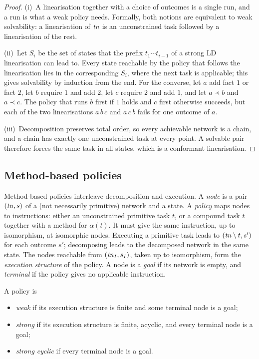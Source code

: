 \begin{proof}
  (i)~A linearisation together with a choice of outcomes is a single run, and a run is what a
  weak policy needs. Formally, both notions are equivalent to weak solvability: a linearisation
  of $\mathit{tn}$ is an unconstrained task followed by a linearisation of the rest.

  (ii)~Let $S_i$ be the set of states that the prefix $t_1\cdots t_{i-1}$ of a strong LD
  linearisation can lead to. Every state reachable by the policy that follows the linearisation
  lies in the corresponding $S_i$, where the next task is applicable; this gives solvability by
  induction from the end. For the converse, let $a$ add fact $1$ or fact $2$, let $b$ require $1$
  and add $2$, let $c$ require $2$ and add $1$, and let $a\prec b$ and $a\prec c$. The policy that
  runs $b$ first if $1$ holds and $c$ first otherwise succeeds, but each of the two
  linearisations $a\,b\,c$ and $a\,c\,b$ fails for one outcome of $a$.

  (iii)~Decomposition preserves total order, so every achievable network is a chain, and a chain
  has exactly one unconstrained task at every point. A solvable pair therefore forces the same
  task in all states, which is a conformant linearisation.
\end{proof}

\subsection{Method-based policies}

Method-based policies \pCBb{} interleave decomposition and execution. A \emph{node} is a pair
$(\mathit{tn},s)$ of a (not necessarily primitive) network and a state. A \emph{policy} maps nodes to
instructions: either an unconstrained primitive task $t$, or a compound task $t$ together with a
method for $\alpha(t)$. It must give the same instruction, up to isomorphism, at isomorphic nodes.
Executing a primitive task leads to $(\mathit{tn}\setminus t,s')$ for each outcome $s'$; decomposing
leads to the decomposed network in the same state. The nodes reachable from $(\mathit{tn}_I,s_I)$, taken
up to isomorphism, form the \emph{execution structure} of the policy. A node is a \emph{goal} if
its network is empty, and \emph{terminal} if the policy gives no applicable instruction.

\begin{definition}\label{def:mp}
  A policy is
  \begin{itemize}
    \item \emph{weak} if its execution structure is finite and some terminal node is a goal;
    \item \emph{strong} if its execution structure is finite, acyclic, and every terminal node is
      a goal;
    \item \emph{strong cyclic} if every terminal node is a goal.
  \end{itemize}
\end{definition}

